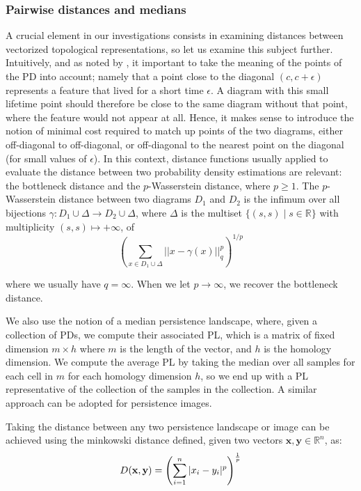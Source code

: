 \documentclass{article}
\begin{document}
\subsubsection{Pairwise distances and medians}

A crucial element in our investigations consists in examining distances between vectorized topological representations, so let us examine this subject further. Intuitively, and as noted by \citep{berwald2018computing}, it important to take the meaning of the points of the PD into account; namely that a point close to the diagonal $(c,c+\epsilon)$ represents a feature that lived for a short time $\epsilon$. A diagram with this small lifetime point should therefore be close to the same diagram without that point, where the feature would not appear at all. Hence, it makes sense to introduce the notion of minimal cost required to match up points of the two diagrams, either off-diagonal to off-diagonal, or off-diagonal to  the nearest point on the diagonal (for small values of $\epsilon$). In this context, distance functions usually applied to evaluate the distance between two probability density estimations are relevant: the bottleneck distance and the $p$-Wasserstein distance, where $p\geq 1$. The $p$-Wasserstein distance between two diagrams $D_1$ and $D_2$ is the infimum over all bijections $\gamma: D_1 \cup \Delta \to D_2 \cup \Delta$, where $\Delta$ is the multiset $\lbrace (s, s) \mid s \in \mathbb{R} \rbrace$ with multiplicity $(s,s) \mapsto +\infty$, of
\begin{equation}
  \label{eq:wasserstein_distance}
  \left(\sum_{x \in D_1 \cup \Delta} ||x - \gamma(x)||_q^p \right)^{1/p}
\end{equation}

where we usually have $q=\infty$. When we let $p\to\infty$, we recover the bottleneck distance.

We also use the notion of a median persistence landscape, where, given a collection of PDs, we compute their associated PL, which is a matrix of fixed dimension $m\times h$ where $m$ is the length of the vector, and $h$ is the homology dimension. We compute the average PL by taking the median over all samples for each cell in $m$ for each homology dimension $h$, so we end up with a PL representative of the collection of the samples in the collection. A similar approach can be adopted for persistence images.

Taking the distance between any two persistence landscape or image can be achieved using the minkowski distance defined, given two vectors $\mathbf{x},\mathbf{y}\in\mathbb{R}^n$, as:
\begin{equation}
  \label{eq:minkowski}
  D(\mathbf{x},\mathbf{y}) = \left(\sum_{i=1}^{n}|x_i-y_i|^p\right)^{1\over p}
\end{equation}
\end{document}
